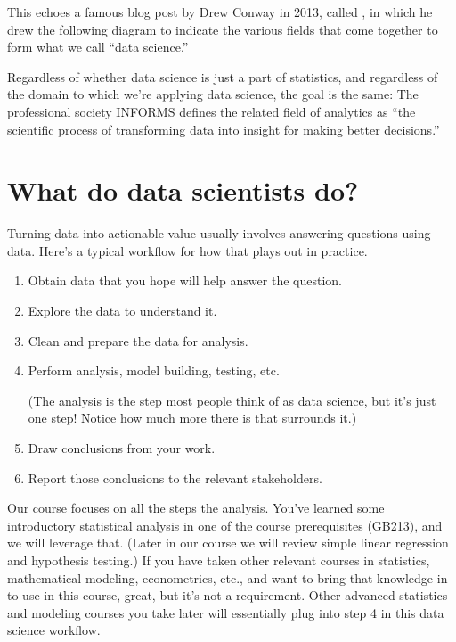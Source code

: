 \documentclass[letterpaper,10pt,english]{sphinxmanual}
\begin{document}
This echoes a famous blog post by Drew Conway in 2013, called , in which he drew the following diagram to indicate the various fields that come together to form what we call “data science.”


Regardless of whether data science is just a part of statistics, and regardless of the domain to which we’re applying data science, the goal is the same:   The professional society INFORMS defines the related field of analytics as “the scientific process of transforming data into insight for making better decisions.”


\section{What do data scientists do?}
\label{\detokenize{chapter-1-intro-to-data-science:what-do-data-scientists-do}}
Turning data into actionable value usually involves answering questions using data.  Here’s a typical workflow for how that plays out in practice.
\begin{enumerate}
%
\item {} 
Obtain data that you hope will help answer the question.

\item {} 
Explore the data to understand it.

\item {} 
Clean and prepare the data for analysis.

\item {} 
Perform analysis, model building, testing, etc.

(The analysis is the step most people think of as data science, but it’s just one step!  Notice how much more there is that surrounds it.)

\item {} 
Draw conclusions from your work.

\item {} 
Report those conclusions to the relevant stakeholders.

\end{enumerate}

Our course focuses on all the steps  the analysis.  You’ve learned some introductory statistical analysis in one of the course prerequisites (GB213), and we will leverage that.  (Later in our course we will review simple linear regression and hypothesis testing.)  If you have taken other relevant courses in statistics, mathematical modeling, econometrics, etc., and want to bring that knowledge in to use in this course, great, but it’s not a requirement.  Other advanced statistics and modeling courses you take later will essentially plug into step 4 in this data science workflow.
\end{document}
